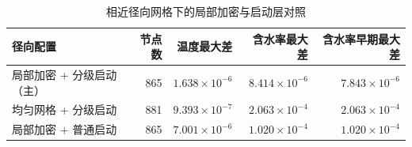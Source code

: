 \begin{table}[H]
\centering\small
\caption{相近径向网格下的局部加密与启动层对照}\label{tab:ablation}
\begin{tabular}{lrrrr}
\toprule
径向配置 & 节点数 & 温度最大差 & 含水率最大差 & 含水率早期最大差\\
\midrule
局部加密 + 分级启动（主） & 865 & $1.638\times10^{-6}$ & $8.414\times10^{-6}$ & $7.843\times10^{-6}$ \\
均匀网格 + 分级启动 & 881 & $9.393\times10^{-7}$ & $2.063\times10^{-4}$ & $2.063\times10^{-4}$ \\
局部加密 + 普通启动 & 865 & $7.001\times10^{-6}$ & $1.020\times10^{-4}$ & $1.020\times10^{-4}$ \\
\bottomrule
\end{tabular}
\end{table}

